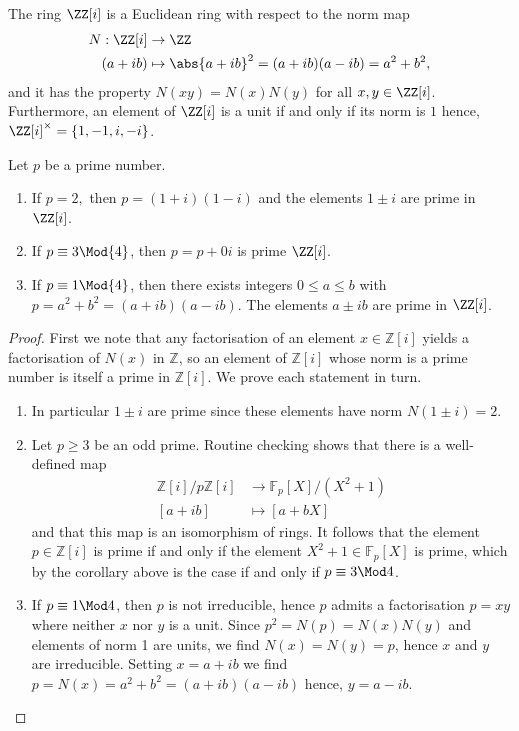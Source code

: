\documentclass[12pt, a4paper]{article}
\begin{document}
\begin{mdexample}
    The ring \(\ZZ[i]\) is a Euclidean ring with respect to the norm map 
    \[\begin{aligned}
        N:\ZZ[i] &\to \ZZ \\
        (a+ib) &\mapsto \abs{a+ib}^2 =(a+ib)(a-ib)=a^2+b^2,
    \end{aligned}\] 
    and it has the property \(N(xy)=N(x)N(y)\) for all \(x,y \in \ZZ[i]\). Furthermore, an element of \(\ZZ[i]\) is a unit if and only if its norm is \(1\) hence, \(\ZZ[i]^{\times}=\left\{ 1,-1,i,-i \right\}\).
\end{mdexample}

\begin{mdprop}
    Let \(p\) be a prime number.
    \begin{enumerate}
        \item If \(p=2,\) then \(p=(1+i)(1-i)\) and the elements \(1\pm i\) are prime in \(\ZZ[i]\).
        \item If \(p\equiv 3 \Mod{4}\), then \(p=p+0i\) is prime \(\ZZ[i]\).
        \item If \(p \equiv 1\Mod{4}\), then there exists integers \(0 \leq a \leq b\) with \(p=a^2+b^2 = (a+ib)(a-ib)\). The elements \(a\pm ib\) are prime in \(\ZZ[i]\).
    \end{enumerate}
\end{mdprop}

\begin{proof}
    First we note that any factorisation of an element \( x \in \mathbb{Z}[i] \) yields a factorisation of \( N(x) \) in \( \mathbb{Z} \), so an element of \( \mathbb{Z}[i] \) whose norm is a prime number is itself a prime in \( \mathbb{Z}[i] \). We prove each statement in turn.
    \begin{enumerate}
        \item In particular \( 1 \pm i \) are prime since these elements have norm \( N(1 \pm i) = 2 \).
        \item Let \( p \geq 3 \) be an odd prime. Routine checking shows that there is a well-defined map
        \[\begin{aligned}
            \mathbb{Z}[i]/p\mathbb{Z}[i] &\to \mathbb{F}_{p}[X]/(X^2 + 1) \\
            [a+ib]&\mapsto [a+bX]
        \end{aligned}\]
        and that this map is an isomorphism of rings. It follows that the element \( p \in \mathbb{Z}[i] \) is prime if and only if the element \( X^2 + 1 \in \mathbb{F}_{p}[X] \) is prime, which by the corollary above is the case if and only if \( p \equiv 3 \Mod 4 \). 
        \item If \( p \equiv 1 \Mod 4 \), then \( p \) is not irreducible, hence \( p \) admits a factorisation \( p = xy \) where neither \( x \) nor \( y \) is a unit. Since \( p^2 = N(p) = N(x)N(y) \) and elements of norm 1 are units, we find \( N(x) = N(y) = p \), hence \( x \) and \(y\) are irreducible. Setting \(x=a+ib\) we find \(p=N(x)=a^2+b^2 = (a+ib)(a-ib)\) hence, \(y=a-ib\).
    \end{enumerate}
\end{proof}
\end{document}
